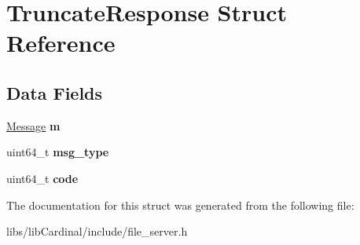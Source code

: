 \hypertarget{structTruncateResponse}{}\section{Truncate\+Response Struct Reference}
\label{structTruncateResponse}
\subsection*{Data Fields}
\begin{DoxyCompactItemize}
\item 
\hyperlink{structMessage}{Message} {\bfseries m}\hypertarget{structTruncateResponse_abcc991420813319030fb45f010cb6e76}{}\label{structTruncateResponse_abcc991420813319030fb45f010cb6e76}

\item 
uint64\+\_\+t {\bfseries msg\+\_\+type}\hypertarget{structTruncateResponse_a840faa744b483ad3edcb8965be92ab03}{}\label{structTruncateResponse_a840faa744b483ad3edcb8965be92ab03}

\item 
uint64\+\_\+t {\bfseries code}\hypertarget{structTruncateResponse_a54ae127545c1218b02478e501927285f}{}\label{structTruncateResponse_a54ae127545c1218b02478e501927285f}

\end{DoxyCompactItemize}


The documentation for this struct was generated from the following file\+:\begin{DoxyCompactItemize}
\item 
libs/lib\+Cardinal/include/file\+\_\+server.\+h\end{DoxyCompactItemize}
